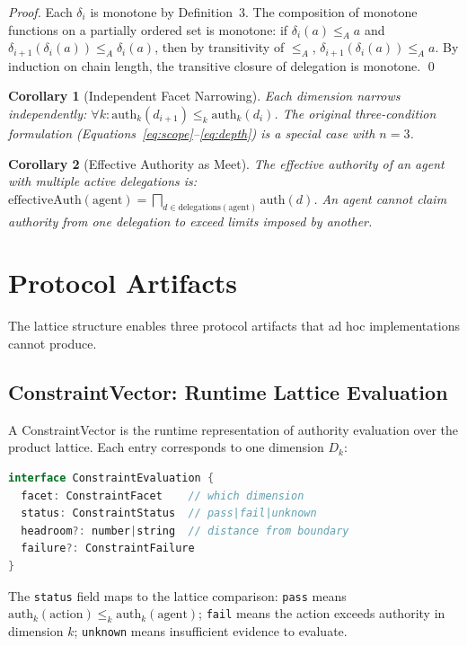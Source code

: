 \documentclass[sigconf,nonacm]{acmart}
\newtheorem{corollary}{Corollary}
\begin{document}
\begin{proof}
Each $\delta_i$ is monotone by Definition~3. The composition of monotone functions
on a partially ordered set is monotone: if $\delta_i(a) \leq_A a$ and
$\delta_{i+1}(\delta_i(a)) \leq_A \delta_i(a)$, then by transitivity of $\leq_A$,
$\delta_{i+1}(\delta_i(a)) \leq_A a$. By induction on chain length, the transitive
closure of delegation is monotone. \qed
\end{proof}

\begin{corollary}[Independent Facet Narrowing]
Each dimension narrows independently:
$\forall k: \text{auth}_k(d_{i+1}) \leq_k \text{auth}_k(d_i)$.
The original three-condition formulation (Equations~\ref{eq:scope}--\ref{eq:depth})
is a special case with $n=3$.
\end{corollary}

\begin{corollary}[Effective Authority as Meet]
The effective authority of an agent with multiple active delegations is:
$\text{effectiveAuth}(\text{agent}) = \bigsqcap_{d \in \text{delegations}(\text{agent})} \text{auth}(d)$.
An agent cannot claim authority from one delegation to exceed limits imposed by another.
\end{corollary}

\section{Protocol Artifacts}

The lattice structure enables three protocol artifacts that ad hoc implementations
cannot produce.

\subsection{ConstraintVector: Runtime Lattice Evaluation}

A ConstraintVector is the runtime representation of authority evaluation over the product
lattice. Each entry corresponds to one dimension $D_k$:

\begin{lstlisting}[language=Java,caption=ConstraintVector type]
interface ConstraintEvaluation {
  facet: ConstraintFacet    // which dimension
  status: ConstraintStatus  // pass|fail|unknown
  headroom?: number|string  // distance from boundary
  failure?: ConstraintFailure
}
\end{lstlisting}

The \texttt{status} field maps to the lattice comparison:
\texttt{pass} means $\text{auth}_k(\text{action}) \leq_k \text{auth}_k(\text{agent})$;
\texttt{fail} means the action exceeds authority in dimension $k$;
\texttt{unknown} means insufficient evidence to evaluate.
\end{document}
